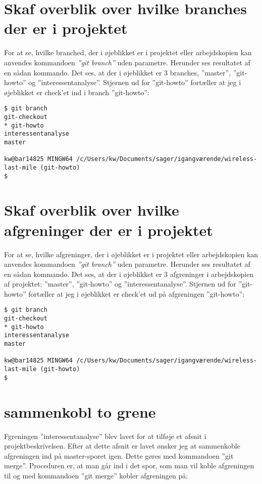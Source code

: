 \documentclass[11pt,a4paper,twoside]{report}
\begin{document}
\section{Skaf overblik over hvilke branches der er i projektet}
For at se, hvilke branched, der i øjeblikket er i projektet eller arbejdskopien kan anvendes kommandoen \emph{''git branch''} uden parametre. Herunder ses resultatet af en sådan kommando. Det ses, at der i øjeblikket er 3 branches, ''master'', ''git-howto'' og ''interessentanalyse''. Stjernen ud for ''git-howto'' fortæller at jeg i øjeblikket er check'et ind i branch ''git-howto'':

\begin{verbatim}
$ git branch
git-checkout
* git-howto
interessentanalyse
master

kw@bar14825 MINGW64 /c/Users/kw/Documents/sager/igangværende/wireless-last-mile (git-howto)
$

\end{verbatim}


\section{Skaf overblik over hvilke afgreninger der er i projektet}
For at se, hvilke afgreninger, der i øjeblikket er i projektet eller arbejdskopien kan anvendes kommandoen \emph{''git branch''} uden parametre. Herunder ses resultatet af en sådan kommando. Det ses, at der i øjeblikket er 3 afgreninger i arbejdskopien af projektet: ''master'', ''git-howto'' og ''interessentanalyse''. Stjernen ud for ''git-howto'' fortæller at jeg i øjeblikket er check'et ud på afgreningen ''git-howto'':

\begin{verbatim}
$ git branch
git-checkout
* git-howto
interessentanalyse
master

kw@bar14825 MINGW64 /c/Users/kw/Documents/sager/igangværende/wireless-last-mile (git-howto)
$

\end{verbatim}


\section{sammenkobl to grene}
Fgreningen ''interessentanalyse'' blev lavet for at tilføje et afsnit i projektbeskrivelsen. Efter at dette afsnit er lavet ønsker jeg at sammenkoble afgreningen ind på master-sporet igen. Dette gøres med kommandoen ''git merge''. Proceduren er, at man går ind i det spor, som man vil koble afgreningen til og med kommandoen ''git merge'' kobler afgreningen på:

\begin{verbatim}

\end{verbatim}

\section{}
\end{document}
